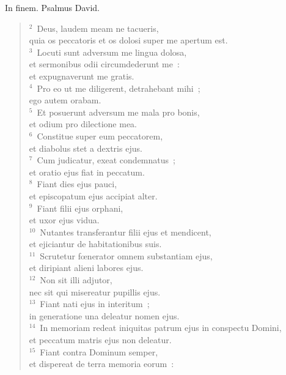 \lettrine[lines=3,image=true,loversize=0.05,lraise=-0.03]{I}{}n finem. Psalmus David.
\begin{flushleft}\begin{verse}\vspace{6pt}${}^{2}$~Deus, laudem meam ne tacueris,\\ quia os peccatoris et os dolosi super me apertum est.\\
${}^{3}$~Locuti sunt adversum me lingua dolosa,\\ et sermonibus odii circumdederunt me~:\\ et expugnaverunt me gratis.\\
${}^{4}$~Pro eo ut me diligerent, detrahebant mihi~;\\ ego autem orabam.\\
${}^{5}$~Et posuerunt adversum me mala pro bonis,\\ et odium pro dilectione mea.\\
${}^{6}$~Constitue super eum peccatorem,\\ et diabolus stet a dextris ejus.\\
${}^{7}$~Cum judicatur, exeat condemnatus~;\\ et oratio ejus fiat in peccatum.\\
${}^{8}$~Fiant dies ejus pauci,\\ et episcopatum ejus accipiat alter.\\
${}^{9}$~Fiant filii ejus orphani,\\ et uxor ejus vidua.\\
${}^{10}$~Nutantes transferantur filii ejus et mendicent,\\ et ejiciantur de habitationibus suis.\\
${}^{11}$~Scrutetur fœnerator omnem substantiam ejus,\\ et diripiant alieni labores ejus.\\
${}^{12}$~Non sit illi adjutor,\\ nec sit qui misereatur pupillis ejus.\\
${}^{13}$~Fiant nati ejus in interitum~;\\ in generatione una deleatur nomen ejus.\\
${}^{14}$~In memoriam redeat iniquitas patrum ejus in conspectu Domini,\\ et peccatum matris ejus non deleatur.\\
${}^{15}$~Fiant contra Dominum semper,\\ et dispereat de terra memoria eorum~:\\

\end{verse}
\end{flushleft}
